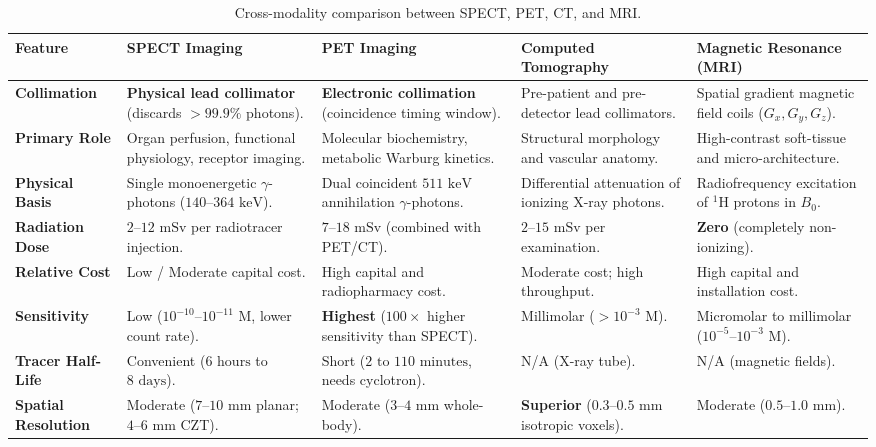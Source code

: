 \documentclass[11pt,a4paper]{article}
\begin{document}
\begin{table}[htbp]
\centering
\small
\setlength{\tabcolsep}{2.5pt}
\renewcommand{\arraystretch}{1.25}
\begin{tabular}{p{2.2cm}p{3.1cm}p{3.1cm}p{3.1cm}p{3.1cm}}
\toprule
\textbf{Feature} & \textbf{SPECT Imaging} & \textbf{PET Imaging} & \textbf{Computed Tomography} & \textbf{Magnetic Resonance (MRI)} \\
\midrule
\textbf{Collimation} & \textbf{Physical lead collimator} (discards $>99.9\%$ photons). & \textbf{Electronic collimation} (coincidence timing window). & Pre-patient and pre-detector lead collimators. & Spatial gradient magnetic field coils ($G_x, G_y, G_z$). \\
\textbf{Primary Role} & Organ perfusion, functional physiology, receptor imaging. & Molecular biochemistry, metabolic Warburg kinetics. & Structural morphology and vascular anatomy. & High-contrast soft-tissue and micro-architecture. \\
\textbf{Physical Basis} & Single monoenergetic $\gamma$-photons ($140\text{--}364\text{ keV}$). & Dual coincident $511\text{ keV}$ annihilation $\gamma$-photons. & Differential attenuation of ionizing X-ray photons. & Radiofrequency excitation of $^1\text{H}$ protons in $B_0$. \\
\textbf{Radiation Dose} & $2\text{--}12\text{ mSv}$ per radiotracer injection. & $7\text{--}18\text{ mSv}$ (combined with PET/CT). & $2\text{--}15\text{ mSv}$ per examination. & \textbf{Zero} (completely non-ionizing). \\
\textbf{Relative Cost} & Low / Moderate capital cost. & High capital and radiopharmacy cost. & Moderate cost; high throughput. & High capital and installation cost. \\
\textbf{Sensitivity} & Low ($10^{-10}\text{--}10^{-11}\text{ M}$, lower count rate). & \textbf{Highest} ($100\times$ higher sensitivity than SPECT). & Millimolar ($>10^{-3}\text{ M}$). & Micromolar to millimolar ($10^{-5}\text{--}10^{-3}\text{ M}$). \\
\textbf{Tracer Half-Life} & Convenient ($6\text{ hours}$ to $8\text{ days}$). & Short ($2\text{ to }110\text{ minutes}$, needs cyclotron). & N/A (X-ray tube). & N/A (magnetic fields). \\
\textbf{Spatial Resolution} & Moderate ($7\text{--}10\text{ mm}$ planar; $4\text{--}6\text{ mm}$ CZT). & Moderate ($3\text{--}4\text{ mm}$ whole-body). & \textbf{Superior} ($0.3\text{--}0.5\text{ mm}$ isotropic voxels). & Moderate ($0.5\text{--}1.0\text{ mm}$). \\
\bottomrule
\end{tabular}
\caption{Cross-modality comparison between SPECT, PET, CT, and MRI.}
\label{tab:modality_comparison}
\end{table}
\end{document}
